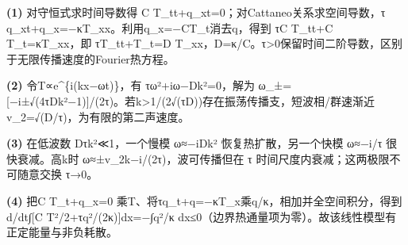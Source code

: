 \par\noindent\textbf{(1)} 对守恒式求时间导数得 C T\_tt+q\_xt=0；对Cattaneo关系求空间导数，τ q\_xt+q\_x=−κT\_xx。利用q\_x=−CT\_t消去q，得到 τC T\_tt+C T\_t=κT\_xx，即 τT\_tt+T\_t=D T\_xx，D=κ/C。τ>0保留时间二阶导数，区别于无限传播速度的Fourier热方程。
\par\noindent\textbf{(2)} 令T∝e\textasciicircum{}\{i(kx−ωt)\}，有 τω²+iω−Dk²=0，解为 ω\_±=[−i±√(4τDk²−1)]/(2τ)。若k>1/(2√(τD))存在振荡传播支，短波相/群速渐近 v\_2=√(D/τ)，为有限的第二声速度。
\par\noindent\textbf{(3)} 在低波数 Dτk²≪1，一个慢模 ω≈−iDk² 恢复热扩散，另一个快模 ω≈−i/τ 很快衰减。高k时 ω≈±v\_2k−i/(2τ)，波可传播但在 τ 时间尺度内衰减；这两极限不可随意交换 τ→0。
\par\noindent\textbf{(4)} 把C T\_t+q\_x=0 乘T、将τq\_t+q=−κT\_x乘q/κ，相加并全空间积分，得到 d/dt∫[C T²/2+τq²/(2κ)]dx=−∫q²/κ dx≤0（边界热通量项为零）。故该线性模型有正定能量与非负耗散。
